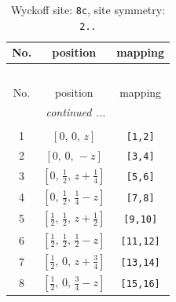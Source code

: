 \documentclass[fleqn,8pt]{jsarticle}
\begin{document}
\renewcommand{\arraystretch}{1.2}
\begin{longtable}{ccc}
\caption{Wyckoff site: {\tt 8c}, site symmetry: {\tt 2..}}
 \\
 \hline \hline
No. & position & mapping \\ \hline \endfirsthead

\multicolumn{2}{l}{\tablename\ \thetable{}} \\
 \hline \hline
No. & position & mapping \\ \hline \endhead

 \hline \hline
\multicolumn{2}{r}{\footnotesize\it continued ...} \\ \endfoot

 \hline \hline
\multicolumn{2}{r}{} \\ \endlastfoot

1 & $\left[ 0,\, 0,\, z \right]$ & {\tt [1,2]} \\ \hline
2 & $\left[ 0,\, 0,\, - z \right]$ & {\tt [3,4]} \\ \hline
3 & $\left[ 0,\, \frac{1}{2},\, z + \frac{1}{4} \right]$ & {\tt [5,6]} \\ \hline
4 & $\left[ 0,\, \frac{1}{2},\, \frac{1}{4} - z \right]$ & {\tt [7,8]} \\ \hline
5 & $\left[ \frac{1}{2},\, \frac{1}{2},\, z + \frac{1}{2} \right]$ & {\tt [9,10]} \\ \hline
6 & $\left[ \frac{1}{2},\, \frac{1}{2},\, \frac{1}{2} - z \right]$ & {\tt [11,12]} \\ \hline
7 & $\left[ \frac{1}{2},\, 0,\, z + \frac{3}{4} \right]$ & {\tt [13,14]} \\ \hline
8 & $\left[ \frac{1}{2},\, 0,\, \frac{3}{4} - z \right]$ & {\tt [15,16]} \\
\end{longtable}
\renewcommand{\arraystretch}{1.2}
\end{document}

